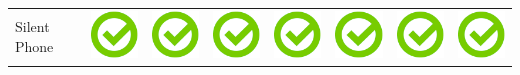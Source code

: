 \documentclass[10pt,foldmark,tumble]{leaflet}
\begin{document}
{\begin{tabular}{ L{2cm} | C{2cm} | C{2cm} | C{2cm} | C{2cm} | C{2cm} | C{2cm} | C{2cm} | }
Silent Phone & \includegraphics[scale=0.1]{pics/haken.png} & \includegraphics[scale=0.1]{pics/haken.png} & \includegraphics[scale=0.1]{pics/haken.png} & \includegraphics[scale=0.1]{pics/haken.png} & \includegraphics[scale=0.1]{pics/haken.png} & \includegraphics[scale=0.1]{pics/haken.png} & \includegraphics[scale=0.1]{pics/haken.png} \tabularnewline

\end{tabular}}
\end{document}

